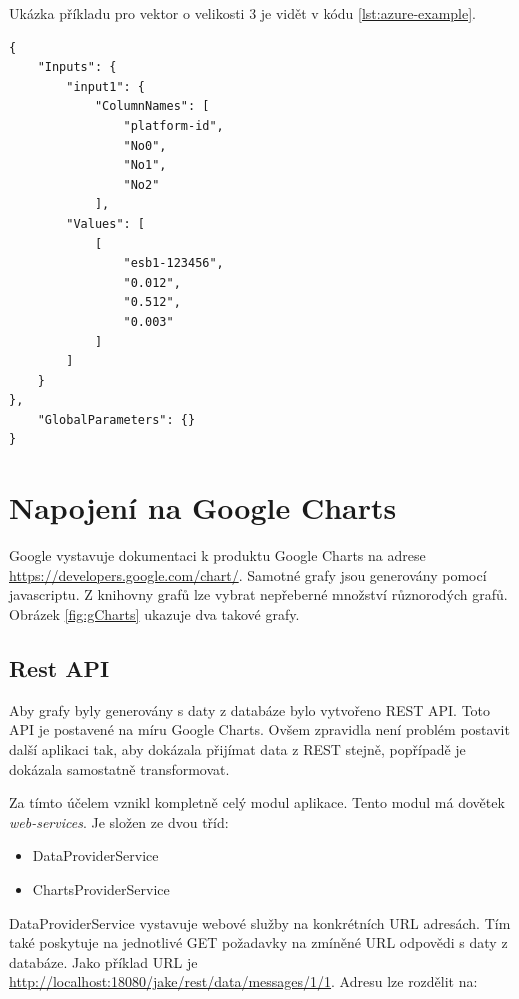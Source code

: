 \documentclass[thesis=M,czech]{FITthesis}[2012/10/20]
\begin{document}
		Ukázka příkladu pro vektor o velikosti 3 je vidět v kódu \ref{lst:azure-example}.
		
		
			\begin{lstlisting}[caption={Požadavek na webovou službu Azure ML}, label={lst:azure-example}]
{
	"Inputs": {
		"input1": {
			"ColumnNames": [
				"platform-id",
				"No0",
				"No1",
				"No2"
			],
		"Values": [
			[
				"esb1-123456",
				"0.012",
				"0.512",
				"0.003"
			]
		]
	}
},
	"GlobalParameters": {}
}
			\end{lstlisting}
	
					

		
	\section{Napojení na Google Charts}
		Google vystavuje dokumentaci k produktu Google Charts na adrese \url{https://developers.google.com/chart/}. Samotné grafy jsou generovány pomocí javascriptu. Z knihovny grafů lze vybrat nepřeberné množství různorodých grafů. Obrázek \ref{fig:gCharts} ukazuje dva takové grafy.
		
		\subsection{Rest API}
			Aby grafy byly generovány s daty z databáze bylo vytvořeno REST API. Toto API je postavené na míru Google Charts. Ovšem zpravidla není problém postavit další aplikaci tak, aby dokázala přijímat data z REST stejně, popřípadě je dokázala samostatně transformovat.
		
			Za tímto účelem vznikl kompletně celý modul aplikace. Tento modul má dovětek \textit{web-services}. Je složen ze dvou tříd:
		
		\begin{itemize} 
			\item DataProviderService
			\item ChartsProviderService			
		\end{itemize}
		
		DataProviderService vystavuje webové služby na konkrétních URL adresách. Tím také poskytuje na jednotlivé GET požadavky na zmíněné URL odpovědi s daty z databáze. Jako příklad URL je \url{http://localhost:18080/jake/rest/data/messages/1/1}. Adresu lze rozdělit na:
		
\end{document}
